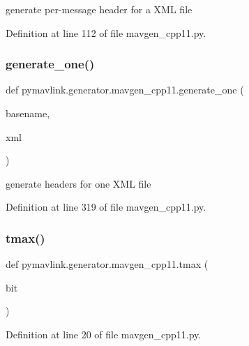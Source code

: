 \begin{DoxyVerb}generate per-message header for a XML file\end{DoxyVerb}
 

Definition at line 112 of file mavgen\+\_\+cpp11.\+py.

\mbox{\label{namespacepymavlink_1_1generator_1_1mavgen__cpp11_a64628a652f5243b623280750d9655f7e}} 
\subsubsection{\texorpdfstring{generate\_one()}{generate\_one()}}
{\footnotesize\ttfamily def pymavlink.\+generator.\+mavgen\+\_\+cpp11.\+generate\+\_\+one (\begin{DoxyParamCaption}\item[{}]{basename,  }\item[{}]{xml }\end{DoxyParamCaption})}

\begin{DoxyVerb}generate headers for one XML file\end{DoxyVerb}
 

Definition at line 319 of file mavgen\+\_\+cpp11.\+py.

\mbox{\label{namespacepymavlink_1_1generator_1_1mavgen__cpp11_af2c11cc64c4dac58aa5a7dd8702a5edd}} 
\subsubsection{\texorpdfstring{tmax()}{tmax()}}
{\footnotesize\ttfamily def pymavlink.\+generator.\+mavgen\+\_\+cpp11.\+tmax (\begin{DoxyParamCaption}\item[{}]{bit }\end{DoxyParamCaption})}



Definition at line 20 of file mavgen\+\_\+cpp11.\+py.



